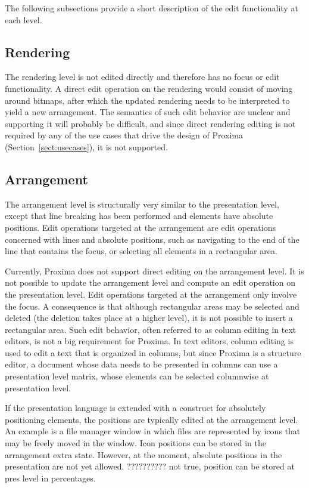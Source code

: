 The following subsections provide a short description of the edit functionality at each level. 
 
 
%																
\subsection{Rendering}

The rendering level is not edited directly and therefore has no focus or edit functionality. A direct edit operation on the rendering would consist of moving around bitmaps, after which the updated rendering needs to be interpreted to yield a new arrangement. The semantics of such edit behavior are unclear and supporting it will probably be difficult, and since direct rendering editing is not required by any of the use cases that drive the design of Proxima (Section~\ref{sect:usecases}), it is not supported.
  

%																
\subsection{Arrangement}\label{sect:editArr} 

The arrangement level is structurally very similar to the presentation level, except that line breaking has been performed and elements have absolute positions. Edit operations targeted at the arrangement are edit operations concerned with lines and absolute positions, such as navigating to the end of the line that contains the focus, or selecting all elements in a rectangular area.

Currently, Proxima does not support direct editing on the arrangement level. It is not possible to update the arrangement level and compute an edit operation on the presentation level. Edit operations targeted at the arrangement only involve the focus. A consequence is that although rectangular areas may be selected and deleted (the deletion takes place at a higher level), it is not possible to insert a rectangular area. Such edit behavior, often referred to as column editing in text editors, is not a big requirement for Proxima. In text editors, column editing is used to edit a text that is organized in columns, but since Proxima is a structure editor, a document whose data needs to be presented in columns can use a presentation level matrix, whose elements can be selected columnwise at presentation level.

\bc
If the presentation language is extended with a construct for absolutely positioning elements, the positions are typically edited at the arrangement level. An example is a  file manager window in which files are represented by icons that may be freely moved in  the window. Icon positions can be stored in the arrangement extra state. However, at the  moment, absolute positions in the presentation are not yet allowed. 
?????????? not true, position can be stored at pres level in percentages.
\ec

